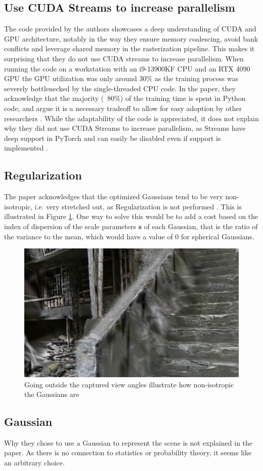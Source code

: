 \subsection{Use CUDA Streams to increase parallelism}
The code provided by the authors showcases a deep understanding of CUDA and GPU architecture,
notably in the way they ensure memory coalescing, avoid bank conflicts and leverage shared memory in the rasterization pipeline.
This makes it surprising that they do not use CUDA streams to increase parallelism.
When running the code on a workstation with an i9-13900KF CPU and an RTX 4090 GPU the GPU utilization was only around 30\% as the training process was severely bottlenecked by the single-threaded CPU code.
In the paper, they acknowledge that the majority (~80\%) of the training time is spent in Python code, and argue it is a necessary tradeoff to allow for easy adoption by other researchers \cite[Sec. 8]{kerbl3DGaussianSplatting2023}.
While the adaptability of the code is appreciated, it does not explain why they did not use CUDA Streams to increase parallelism, as Streams have deep support in PyTorch and can easily be disabled even if support is implemented \cite{pytorchcontributorsCUDASemanticsPyTorch2023}.

\subsection{Regularization}
The paper acknowledges that the optimized Gaussians tend to be very non-isotropic, i.e. very stretched out, as  Regularization is not performed \cite[Sec. 7.4]{kerbl3DGaussianSplatting2023}.
This is illustrated in Figure \ref{fig:very_isotropic}.
One way to solve this would be to add a cost based on the index of dispersion of the scale parameters $\bm{s}$ of each Gaussian, that is the ratio of the variance to the mean, which would have a value of 0 for spherical Gaussians.

\begin{figure}
    \centering
    \includegraphics[width=\linewidth]{images/very_isotropic.png}
    \caption{Going outside the captured view angles illustrate how non-isotropic the Gaussians are \cite{@nekoHashimaIslandCreated2023}}
    \label{fig:very_isotropic}
\end{figure}

\subsection{Gaussian}
Why they chose to use a Gaussian to represent the scene is not explained in the paper.
As there is no connection to statistics or probability theory, it seems like an arbitrary choice.

